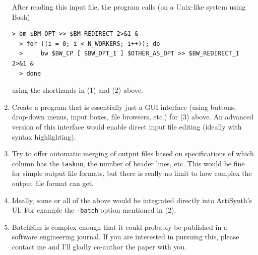\documentclass{article}
\begin{document}
\begin{enumerate}
After reading this input file, the program calls (on a Unix-like system using Bash)

\begin{lstlisting}[]
  > bm $BM_OPT >> $BM_REDIRECT 2>&1 &
  > for ((i = 0; i < N_WORKERS; i++)); do
  >     bw $BW_CP [ $BW_OPT_I ] $OTHER_AS_OPT >> $BW_REDIRECT_I 2>&1 &
  > done
\end{lstlisting}

using the shorthands in (1) and (2) above.

\item Create a program that is essentially just a GUI interface (using buttons, drop-down menus, input boxes, file browsers, etc.) for (3) above. An advanced version of this interface would enable direct input file editing (ideally with syntax highlighting).

\item Try to offer automatic merging of output files based on specifications of which column has the {\tt taskno}, the number of header lines, etc. This would be fine for simple output file formats, but there is really no limit to how complex the output file format can get.

\item Ideally, some or all of the above would be integrated directly into ArtiSynth's UI. For example the {\tt -batch} option mentioned in (2).

\item BatchSim is complex enough that it could probably be published in a software engineering journal. If you are interested in pursuing this, please contact me and I'll gladly co-author the paper with you.

\end{enumerate}
\end{document}
